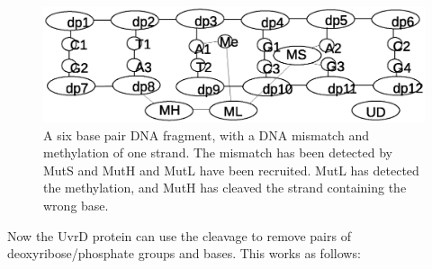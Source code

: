 \documentclass[review]{elsarticle}
\begin{document}
\begin{figure}[h!]
  \centering
    \includegraphics[width=1.0\textwidth]{mmr/state2}
  \caption[A six base pair DNA fragment.]{A six base pair DNA fragment, with a DNA mismatch and methylation of one strand. The mismatch has been detected by MutS and MutH and MutL have been recruited. MutL has detected the methylation, and MutH has cleaved the strand containing the wrong base.}
  \label{fig:state2}
\end{figure}

Now the UvrD protein can use the cleavage to remove pairs of deoxyribose/phosphate groups and bases. This works as follows:
\end{document}
